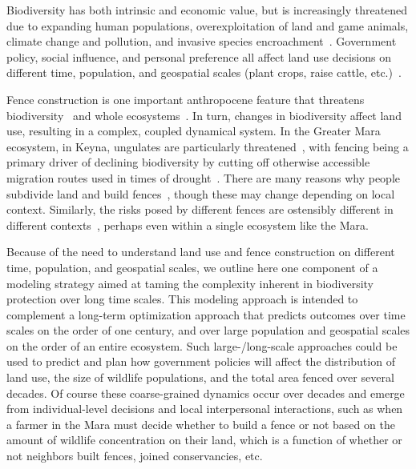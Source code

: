 \documentclass{article}
\begin{document}
Biodiversity has both intrinsic and economic value, but is increasingly threatened
due to expanding human populations, overexploitation of land and game animals,
climate change and pollution, and invasive species encroachment~\cite{Bellard2022}.
Government policy, social influence, and personal preference all affect land use
decisions on different time, population, and geospatial scales 
(plant crops, raise cattle, etc.)~\cite{Eitzel2020,Løvschal2021,Richerson2024}.

Fence construction is one important anthropocene feature that threatens
biodiversity~\cite{Packer2013} and whole 
ecosystems~\cite{Løvschal2017,Løvschal2022}. 
In turn, changes in biodiversity affect land use, resulting in a complex, coupled
dynamical system. In the Greater Mara ecosystem, in Keyna, 
ungulates are particularly threatened~\cite{Ogutu2009}, with fencing being a 
primary driver of declining biodiversity by cutting off otherwise accessible 
migration routes used in times of drought~\cite{Ogutu2016}. 
There are many reasons why people subdivide land and build
fences~\cite{Mwangi2007}, though these may change depending on local context.
Similarly, the risks posed by different fences are ostensibly
different in different contexts~\cite{Bellard2022}, perhaps even within
a single ecosystem like the Mara. 

Because of the need to understand land use and
fence construction on different time, population, and geospatial scales, we
outline here one component of a modeling strategy aimed at taming the 
complexity inherent in
biodiversity protection over long time scales. This modeling approach 
is intended to complement a long-term optimization 
approach that predicts outcomes over
time scales on the order of one century, and over large population and geospatial
scales on the order of an entire ecosystem. Such large-/long-scale approaches
could be used to predict and plan how government policies will affect the distribution of
land use, the size of wildlife populations, and the total area fenced over
several decades.
Of course these coarse-grained dynamics occur over decades and emerge from
individual-level decisions and local interpersonal interactions, such as 
when a farmer in the Mara must decide whether to build a fence or not based on
the amount of wildlife concentration on their land, which is a function of whether or
not neighbors built fences, joined conservancies, etc. 
\end{document}
